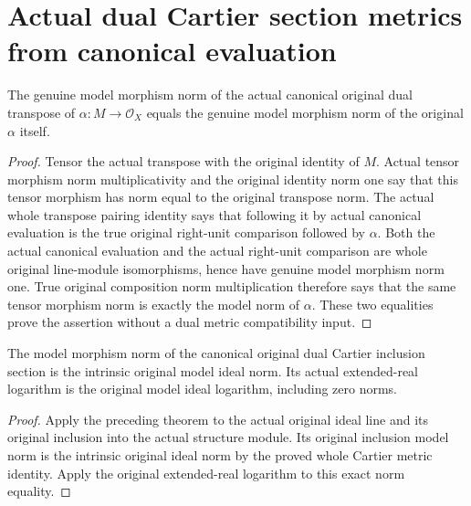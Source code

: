 \section{Actual dual Cartier section metrics from canonical evaluation}

\begin{theorem}
\label{thm:actual-dual-transpose-model-norm}
\leanok
{}
The genuine model morphism norm of the actual canonical original
dual transpose of $\alpha:M\to\mathcal O_X$ equals the genuine
model morphism norm of the original $\alpha$ itself.
\end{theorem}
\begin{proof}
Tensor the actual transpose with the original identity of $M$.
Actual tensor morphism norm multiplicativity and the original
identity norm one say that this tensor morphism has norm equal to
the original transpose norm. The actual whole transpose pairing
identity says that following it by actual canonical evaluation
is the true original right-unit comparison followed by $\alpha$.
Both the actual canonical evaluation and the actual right-unit
comparison are whole original line-module isomorphisms, hence
have genuine model morphism norm one. True original composition
norm multiplication therefore says that the same tensor morphism
norm is exactly the model norm of $\alpha$. These two equalities
prove the assertion without a dual metric compatibility input.
\end{proof}

\begin{corollary}
\label{cor:actual-dual-cartier-inclusion-model-potential}
\leanok
{}
The model morphism norm of the canonical original dual Cartier
inclusion section is the intrinsic original model ideal norm.
Its actual extended-real logarithm is the original model ideal
logarithm, including zero norms.
\end{corollary}
\begin{proof}
Apply the preceding theorem to the actual original ideal line and
its original inclusion into the actual structure module. Its
original inclusion model norm is the intrinsic original ideal
norm by the proved whole Cartier metric identity. Apply the
original extended-real logarithm to this exact norm equality.
\end{proof}
